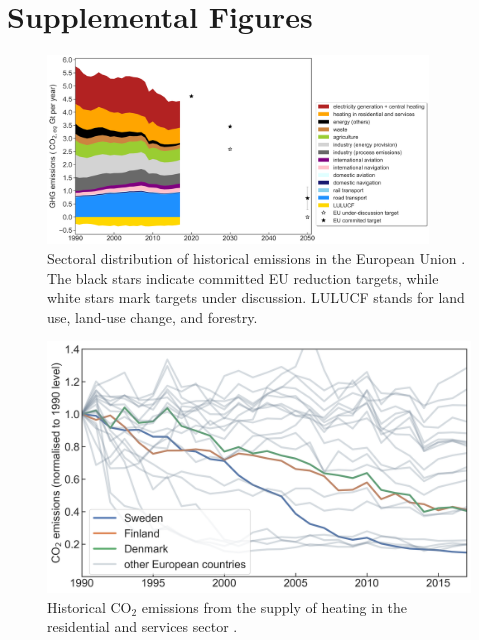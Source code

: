 \documentclass[3p]{elsarticle} %
\begin{document}
\section{Supplemental Figures}
\begin{figure}[!h]
\centering
\includegraphics[width=0.9\textwidth]{../figures/historical_sectoral_emissions.png}
\caption{Sectoral distribution of historical emissions in the European Union \cite{UNFCCC_inventory}. The black stars indicate committed EU reduction targets, while white stars mark targets under discussion. LULUCF stands for land use, land-use change, and forestry.} \label{fig_historical_emissions} 
\end{figure}
\clearpage

\begin{figure}[!h]
\centering
\includegraphics[width=12cm]{../figures/emissions_heating.png}
\caption{Historical CO$_2$ emissions from the supply of heating in the residential and services sector \cite{UNFCCC_inventory}. } \label{fig_emissions_heating} 
\end{figure}
\clearpage
\end{document}
